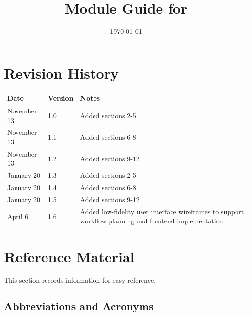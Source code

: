 \documentclass[12pt, titlepage]{article}
\begin{document}
\title{Module Guide for \progname{}} 
\author{\authname}
\date{\today}

\maketitle


\section{Revision History}

\begin{tabularx}{\textwidth}{p{3cm}p{2cm}X}
\toprule {\bf Date} & {\bf Version} & {\bf Notes}\\
\midrule
November 13 & 1.0 & Added sections 2-5\\
November 13 & 1.1 & Added sections 6-8\\
November 13 & 1.2 & Added sections 9-12\\
January 20 & 1.3 & Added sections 2-5\\
January 20 & 1.4 & Added sections 6-8\\
January 20 & 1.5 & Added sections 9-12\\
April 6 & 1.6 & Added low-fidelity user interface wireframes to support workflow planning and frontend implementation\\
\bottomrule
\end{tabularx}

\newpage

\section{Reference Material}

This section records information for easy reference.

\subsection{Abbreviations and Acronyms}
\end{document}
